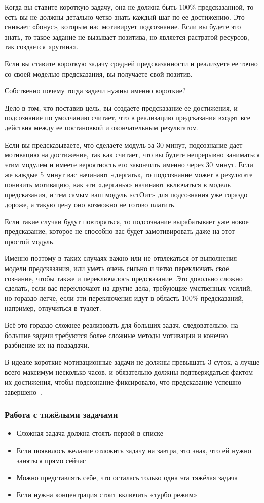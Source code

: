 \documentclass{../industrial-development}
\begin{document}
Когда вы ставите короткую задачу, она не должна быть 100\% предсказанной, то есть вы не должны детально четко знать каждый шаг по ее достижению. Это снижает «бонус», которым нас мотивирует подсознание. Если вы будете это знать, то такое задание не вызывает позитива, но является растратой ресурсов, так создается «рутина».

Если вы ставите короткую задачу средней предсказанности и реализуете ее точно со своей моделью предсказания, вы получаете свой позитив.

Собственно почему тогда задачи нужны именно короткие?

Дело в том, что поставив цель, вы создаете предсказание ее достижения, и подсознание по умолчанию считает, что в реализацию предсказания входят все действия между ее постановкой и окончательным результатом.

Если вы предсказываете, что сделаете модуль за 30 минут, подсознание дает мотивацию на достижение, так как считает, что вы будете непрерывно заниматься этим модулем и имеете вероятность его закончить именно через 30 минут.
Если же каждые 5 минут вас начинают «дергать», то подсознание может в результате понизить мотивацию, как эти «дерганья» начинают включаться в модель предсказания, и тем самым ваш модуль «стОит» для подсознания уже гораздо дороже, а такую цену оно возможно не готово платить.

Если такие случаи будут повторяться, то подсознание вырабатывает уже новое предсказание, которое не способно вас будет замотивировать даже на этот простой модуль.

Именно поэтому в таких случаях важно или не отвлекаться от выполнения модели предсказания, или уметь очень сильно и четко переключать своё сознание, чтобы также и переключалось предсказание. Это довольно сложно сделать, если вас переключают на другие дела, требующие умственных усилий, но гораздо легче, если эти переключения идут в область 100\% предсказаний, например, отлучиться в туалет.

Всё это гораздо сложнее реализовать для больших задач, следовательно, на большие задачи требуются более сложные методы мотивации и конечно разбиение их на подзадачи.

В идеале короткие мотивационные задачи не должны превышать 3 суток, а лучше всего максимум несколько часов, и обязательно должны подтверждаться фактом их достижения, чтобы подсознание фиксировало, что предсказание успешно завершено~\cite{TasksHabr}.

\begin{frame} \frametitle{Работа с тяжёлыми задачами}
  \begin{itemize}
  \item Сложная задача должна стоять первой в списке
  \item Если появилось желание отложить задачу на завтра, это знак, что ей нужно заняться прямо сейчас
  \item Можно представлять себе, что осталась только одна эта тяжёлая задача
  \item Если нужна концентрация стоит включить «турбо режим»
  \end{itemize}
\end{frame}
\end{document}
